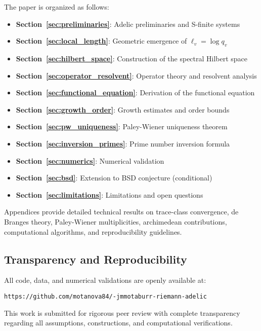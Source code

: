 The paper is organized as follows:
\begin{itemize}
\item \textbf{Section~\ref{sec:preliminaries}}: Adelic preliminaries and S-finite systems
\item \textbf{Section~\ref{sec:local_length}}: Geometric emergence of $\ell_v = \log q_v$
\item \textbf{Section~\ref{sec:hilbert_space}}: Construction of the spectral Hilbert space
\item \textbf{Section~\ref{sec:operator_resolvent}}: Operator theory and resolvent analysis
\item \textbf{Section~\ref{sec:functional_equation}}: Derivation of the functional equation
\item \textbf{Section~\ref{sec:growth_order}}: Growth estimates and order bounds
\item \textbf{Section~\ref{sec:pw_uniqueness}}: Paley-Wiener uniqueness theorem
\item \textbf{Section~\ref{sec:inversion_primes}}: Prime number inversion formula
\item \textbf{Section~\ref{sec:numerics}}: Numerical validation
\item \textbf{Section~\ref{sec:bsd}}: Extension to BSD conjecture (conditional)
\item \textbf{Section~\ref{sec:limitations}}: Limitations and open questions
\end{itemize}

Appendices provide detailed technical results on trace-class convergence, de Branges theory, Paley-Wiener multiplicities, archimedean contributions, computational algorithms, and reproducibility guidelines.

\subsection{Transparency and Reproducibility}

All code, data, and numerical validations are openly available at:
\begin{center}
\texttt{https://github.com/motanova84/-jmmotaburr-riemann-adelic}
\end{center}

This work is submitted for rigorous peer review with complete transparency regarding all assumptions, constructions, and computational verifications.
